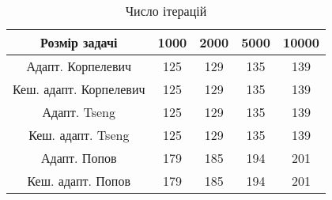 \begin{table}[H]
	\centering
	\begin{tabular}{|c||c|c|c|c|}\hline
		Розмір задачі & 1000 & 2000 & 5000 & 10000 \\ \hline \hline
		Адапт. Корпелевич & 125 & 129 & 135 & 139 \\ \hline
		Кеш. адапт. Корпелевич & 125 & 129 & 135 & 139 \\ \hline
		Адапт. Tseng & 125 & 129 & 135 & 139 \\ \hline
		Кеш. адапт. Tseng & 125 & 129 & 135 & 139 \\ \hline
		Адапт. Попов & 179 & 185 & 194 & 201 \\ \hline
		Кеш. адапт. Попов & 179 & 185 & 194 & 201 \\ \hline
	\end{tabular}
	\caption{Число ітерацій}
\end{table}
